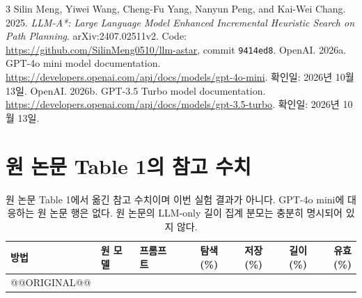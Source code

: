 \documentclass[11pt]{article}
\begin{document}
\noindent\begin{minipage}{\columnwidth}
\begin{thebibliography}{3}
 Silin Meng, Yiwei Wang, Cheng-Fu Yang, Nanyun Peng, and Kai-Wei Chang. 2025. \emph{LLM-A*: Large Language Model Enhanced Incremental Heuristic Search on Path Planning}. arXiv:2407.02511v2. Code: \url{https://github.com/SilinMeng0510/llm-astar}, commit \texttt{9414ed8}.
 OpenAI. 2026a. GPT-4o mini model documentation. \url{https://developers.openai.com/api/docs/models/gpt-4o-mini}. 확인일: 2026년 10월 13일.
 OpenAI. 2026b. GPT-3.5 Turbo model documentation. \url{https://developers.openai.com/api/docs/models/gpt-3.5-turbo}. 확인일: 2026년 10월 13일.
\end{thebibliography}
\end{minipage}

\appendix
\begin{table}[t]
\section{원 논문 Table 1의 참고 수치}\label{app:paper}
\centering\small
\begin{tabular}{lllrrrr}
\toprule
방법 & 원 모델 & 프롬프트 & 탐색(\%) & 저장(\%) & 길이(\%) & 유효(\%)\\
\midrule
@@ORIGINAL@@
\bottomrule
\end{tabular}
\caption{원 논문 Table 1에서 옮긴 참고 수치이며 이번 실험 결과가 아니다. GPT-4o mini에 대응하는 원 논문 행은 없다. 원 논문의 LLM-only 길이 집계 분모는 충분히 명시되어 있지 않다.}
\end{table}
\end{document}

